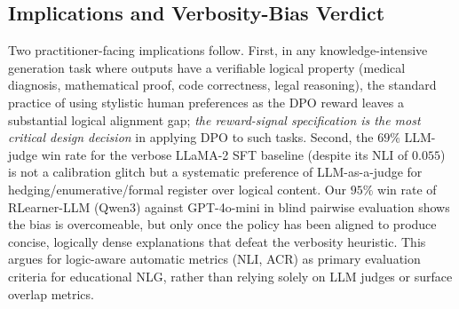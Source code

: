 \subsection{Implications and Verbosity-Bias Verdict}
Two practitioner-facing implications follow. First, in any knowledge-intensive generation task where outputs have a verifiable logical property (medical diagnosis, mathematical proof, code correctness, legal reasoning), the standard practice of using stylistic human preferences as the DPO reward leaves a substantial logical alignment gap; \emph{the reward-signal specification is the most critical design decision} in applying DPO to such tasks. Second, the $69\%$ LLM-judge win rate for the verbose LLaMA-2 SFT baseline (despite its NLI of $0.055$) is not a calibration glitch but a systematic preference of LLM-as-a-judge for hedging/enumerative/formal register over logical content. Our $95\%$ win rate of RLearner-LLM (Qwen3) against GPT-4o-mini in blind pairwise evaluation shows the bias is overcomeable, but only once the policy has been aligned to produce concise, logically dense explanations that defeat the verbosity heuristic. This argues for logic-aware automatic metrics (NLI, ACR) as primary evaluation criteria for educational NLG, rather than relying solely on LLM judges or surface overlap metrics.
